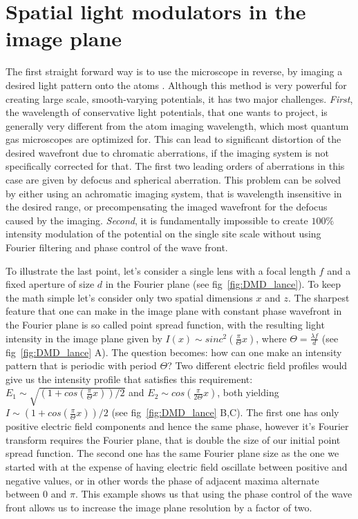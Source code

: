 \section{Spatial light modulators in the image plane}
The first straight forward way is to use the microscope in reverse, by imaging a desired light pattern onto the atoms \cite{P. Schauß thesis, RMA thesis, MAZU thesis}. Although this method is very powerful for creating large scale, smooth-varying potentials, it has two major challenges. \textit{First}, the wavelength of conservative light potentials, that one wants to project, is generally very different from the atom imaging wavelength, which most quantum gas microscopes are optimized for. This can lead to significant distortion of the desired wavefront due to chromatic aberrations, if the imaging system is not specifically corrected for that. The first two leading orders of aberrations in this case are given by defocus and spherical aberration. This problem can be solved by either using an achromatic imaging system, that is wavelength insensitive in the desired range, or precompensating the imaged wavefront for the defocus caused by the imaging. \textit{Second}, it is fundamentally impossible to create $100 \%$ intensity modulation of the potential on the single site scale without using Fourier filtering and phase control of the wave front. 

To illustrate the last point, let's consider a single lens with a focal length $f$ and a fixed aperture of size $d$ in the Fourier plane (see fig~\ref{fig:DMD_lance}). To keep the math simple let's consider only two spatial dimensions $x$ and $z$. The sharpest feature that one can make in the image plane with constant phase wavefront in the Fourier plane is so called point spread function, with the resulting light intensity in the image plane given by $I(x) \sim sinc^2(\frac{\pi}{\Theta} x)$, where $\Theta = \frac{\lambda f}{d}$ (see fig~\ref{fig:DMD_lance} A). The question becomes: how can one make an intensity pattern that is periodic with period $\Theta$? Two different electric field profiles would give us the intensity profile that satisfies this requirement: $E_1 \sim \sqrt{(1+cos(\frac{\pi}{\Theta}x))/2}$ and $E_2 \sim cos(\frac{\pi}{2\Theta} x)$, both yielding $I \sim (1+cos(\frac{\pi}{\Theta}x))/2$ (see fig~\ref{fig:DMD_lance} B,C). The first one has only positive electric field components and hence the same phase, however it's Fourier transform requires the Fourier plane, that is double the size of our initial point spread function. The second one has the same Fourier plane size as the one we started with at the expense of having electric field oscillate between positive and negative values, or in other words the phase of adjacent maxima alternate between $0$ and $\pi$. This example shows us that using the phase control of the wave front allows us to increase the image plane resolution by a factor of two.

